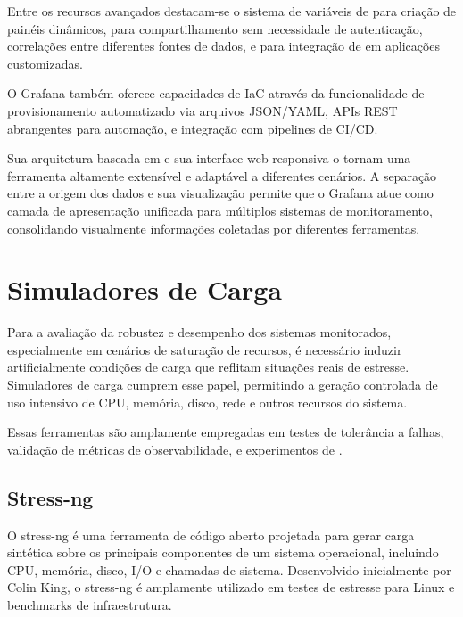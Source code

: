 Entre os recursos avançados destacam-se o sistema de variáveis de  para criação de painéis dinâmicos,  para compartilhamento sem necessidade de autenticação, correlações entre diferentes fontes de dados, e  para integração de  em aplicações customizadas.

O Grafana também oferece capacidades de IaC através da funcionalidade de provisionamento automatizado via arquivos JSON/YAML, APIs REST abrangentes para automação, e integração com pipelines de CI/CD.

Sua arquitetura baseada em  e sua interface web responsiva o tornam uma ferramenta altamente extensível e adaptável a diferentes cenários. A separação entre a origem dos dados e sua visualização permite que o Grafana atue como camada de apresentação unificada para múltiplos sistemas de monitoramento, consolidando visualmente informações coletadas por diferentes ferramentas.

\section{Simuladores de Carga}
\label{section:SimuladoresCarga}

Para a avaliação da robustez e desempenho dos sistemas monitorados, especialmente em cenários de saturação de recursos, é necessário induzir artificialmente condições de carga que reflitam situações reais de estresse. Simuladores de carga cumprem esse papel, permitindo a geração controlada de uso intensivo de CPU, memória, disco, rede e outros recursos do sistema.

Essas ferramentas são amplamente empregadas em testes de tolerância a falhas, validação de métricas de observabilidade, e experimentos de .

\subsection{Stress-ng}
\label{subsection:StressNG}

O stress-ng \citep{stressng2025} é uma ferramenta de código aberto projetada para gerar carga sintética sobre os principais componentes de um sistema operacional, incluindo CPU, memória, disco, I/O e chamadas de sistema. Desenvolvido inicialmente por Colin King, o stress-ng é amplamente utilizado em testes de estresse para  Linux e benchmarks de infraestrutura.

